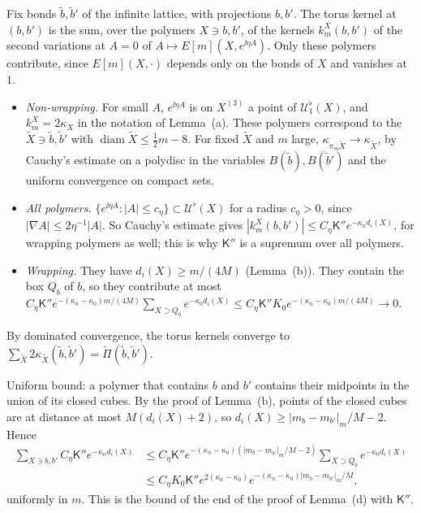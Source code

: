 \begin{step}
Fix bonds $\tilde b,\tilde b'$ of the infinite lattice, with projections $b,b'$. The torus kernel at $(b,b')$ is the sum, over the polymers $X\ni b,b'$, of the kernels $k^X_m(b,b')$ of the second variations at $A=0$ of $A\mapsto E[m](X,e^{\ii\eta A})$. Only these polymers contribute, since $E[m](X,\cdot)$ depends only on the bonds of $X$ and vanishes at $1$.
\begin{itemize}
\item \emph{Non-wrapping.} For small $A$, $e^{\ii\eta A}$ is on $X^{(3)}$ a point of $\mathcal U^\flat_1(X)$, and $k^X_m=2\kappa_X$ in the notation of Lemma~(a). These polymers correspond to the $\tilde X\ni\tilde b,\tilde b'$ with $\operatorname{diam}\tilde X\le\frac12m-8$. For fixed $\tilde X$ and $m$ large, $\kappa_{\pi_m\tilde X}\to\kappa_{\tilde X}$, by Cauchy's estimate on a polydisc in the variables $B(\tilde b),B(\tilde b')$ and the uniform convergence on compact sets.
\item \emph{All polymers.} $\{e^{\ii\eta A}:|A|\le c_\eta\}\subset\mathcal U^\flat(X)$ for a radius $c_\eta>0$, since $|\nabla A|\le2\eta^{-1}|A|$. So Cauchy's estimate gives $|k^X_m(b,b')|\le C_\eta\mathsf K''e^{-\kappa_nd_i(X)}$, for wrapping polymers as well; this is why $\mathsf K''$ is a supremum over all polymers.
\item \emph{Wrapping.} They have $d_i(X)\ge m/(4M)$ (Lemma~(b)). They contain the box $Q_b$ of $b$, so they contribute at most $C_\eta\mathsf K''e^{-(\kappa_n-\kappa_0)m/(4M)}\sum_{X\supset Q_b}e^{-\kappa_0d_i(X)}\le C_\eta\mathsf K''K_0e^{-(\kappa_n-\kappa_0)m/(4M)}\to0$.
\end{itemize}
By dominated convergence, the torus kernels converge to $\sum_{\tilde X}2\kappa_{\tilde X}(\tilde b,\tilde b')=\widetilde\Pi(\tilde b,\tilde b')$.

Uniform bound: a polymer that contains $b$ and $b'$ contains their midpoints in the union of its closed cubes. By the proof of Lemma~(b), points of the closed cubes are at distance at most $M(d_i(X)+2)$, so $d_i(X)\ge|m_b-m_{b'}|_m/M-2$. Hence
\[
\begin{aligned}
\sum_{X\ni b,b'}C_\eta\mathsf K''e^{-\kappa_nd_i(X)}&\le C_\eta\mathsf K''e^{-(\kappa_n-\kappa_0)(|m_b-m_{b'}|_m/M-2)}\sum_{X\supset Q_b}e^{-\kappa_0d_i(X)}\\
&\le C_\eta K_0\mathsf K''e^{2(\kappa_n-\kappa_0)}e^{-(\kappa_n-\kappa_0)|m_b-m_{b'}|_m/M},
\end{aligned}
\]
uniformly in $m$. This is the bound of the end of the proof of Lemma~(d) with $\mathsf K''$.
\end{step}

